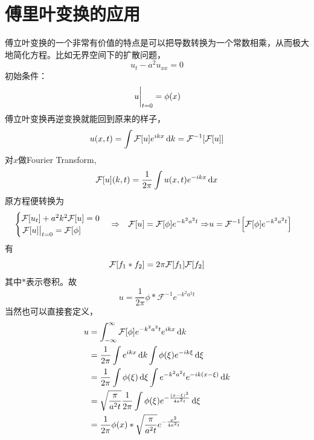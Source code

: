 \documentclass[12pt,a4paper,openany,twoside]{book}
\numberwithin{equation}{section}
\begin{document}
      \section{傅里叶变换的应用}
        傅立叶变换的一个非常有价值的特点是可以把导数转换为一个常数相乘，从而极大地简化方程。比如无界空间下的扩散问题，
        \begin{equation*}
          u_t-a^2u_{xx} = 0
        \end{equation*} 
        初始条件：
        \begin{equation*}
          \eval{u}_{t=0}=\phi\qty(x)
        \end{equation*} 
        傅立叶变换再逆变换就能回到原来的样子，
        \begin{equation*}
          u\qty(x,t)=\int{\mathcal{F}\qty[u]e^{ikx}\dd{k}}=\mathcal{F}^{-1}\qty[\mathcal{F}\qty[u]]
        \end{equation*} 
        对$x$做Fourier Transform,
        \begin{equation*}
          \mathcal{F}\qty[u]\qty(k,t)=\frac{1}{2\pi}\int{u\qty(x,t)e^{-ikx}\dd{x}} 
        \end{equation*} 
        原方程便转换为
        \begin{eqnarray*}
          &\begin{cases}
            \mathcal{F}\qty[u_t]+a^2k^2\mathcal{F}\qty[u]=0\\
            \eval{\mathcal{F}\qty[u]}_{t=0}=\mathcal{F}\qty[\phi]
          \end{cases}
          \Rightarrow&\mathcal{F}\qty[u]=\mathcal{F}\qty[\phi]e^{-k^2a^2t}
          \Rightarrow&u=\mathcal{F}^{-1}\qty[\mathcal{F}\qty[\phi]e^{-k^2a^2t}]
        \end{eqnarray*}
        有
        \begin{equation*}
          \mathcal{F}\qty[f_1 * f_2]=2\pi\mathcal{F}\qty[f_1]\mathcal{F}\qty[f_2]
        \end{equation*}
        其中$*$表示卷积。故
        \begin{equation*}
          u=\frac{1}{2\pi}\phi*\mathcal{F}^{-1}e^{-k^2a^2t} 
        \end{equation*} 
        当然也可以直接套定义，
        \begin{align*}
          u&=\int_{-\infty}^\infty{\mathcal{F}\qty[\phi]e^{-k^2a^2t}e^{ikx}\dd{k}}\\
          &=\frac{1}{2\pi}\int{e^{ikx}\dd{k}\int{\phi\qty(\xi)e^{-ik\xi}\dd{\xi}}}\\
          &=\frac{1}{2\pi}\int{\phi\qty(\xi)\dd{\xi}\int{e^{-k^2a^2t}e^{-ik\qty(x-\xi)}\dd{k}}}\\
          &=\sqrt{\frac{\pi}{a^2 t}}\frac{1}{2\pi}\int{\phi\qty(\xi)e^{-\frac{\qty(x-\xi)^2}{4a^2t}}\dd{\xi}}\\
          &=\frac{1}{2\pi}\phi(x)*\sqrt{\frac{\pi}{a^2t}}e^{-\frac{x^2}{4a^2t}}
        \end{align*}
\end{document}
